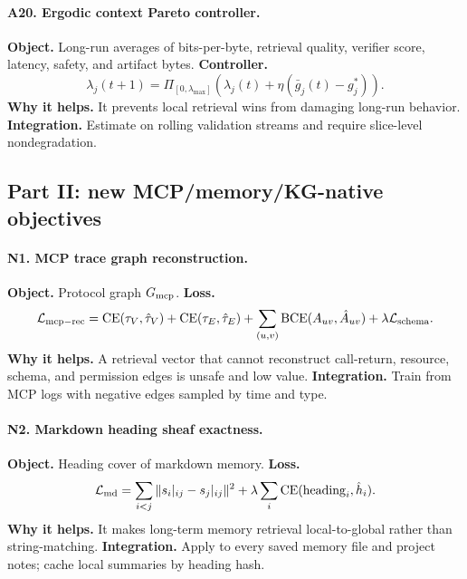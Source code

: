 \documentclass[11pt]{article}
\newcommand{\loss}{\mathcal{L}}
\numberwithin{equation}{section}
\begin{document}
\paragraph{A20. Ergodic context Pareto controller.}
\textbf{Object.} Long-run averages of bits-per-byte, retrieval quality, verifier score, latency, safety, and artifact bytes. \textbf{Controller.}
\begin{equation}
\lambda_j(t+1)=\Pi_{[0,\lambda_{\max}]}
\left(\lambda_j(t)+\eta(\bar g_j(t)-g_j^*)\right).
\end{equation}
\textbf{Why it helps.} It prevents local retrieval wins from damaging long-run behavior. \textbf{Integration.} Estimate on rolling validation streams and require slice-level nondegradation.

\clearpage
\subsection{Part II: new MCP/memory/KG-native objectives}

\paragraph{N1. MCP trace graph reconstruction.}
\textbf{Object.} Protocol graph $G_{\rm mcp}$. \textbf{Loss.}
\begin{equation}
\loss_{\rm mcp-rec}=\operatorname{CE}(\tau_V,\hat\tau_V)+\operatorname{CE}(\tau_E,\hat\tau_E)+\sum_{(u,v)}\operatorname{BCE}(A_{uv},\hat A_{uv})+\lambda\loss_{\rm schema}.
\end{equation}
\textbf{Why it helps.} A retrieval vector that cannot reconstruct call-return, resource, schema, and permission edges is unsafe and low value. \textbf{Integration.} Train from MCP logs with negative edges sampled by time and type.

\paragraph{N2. Markdown heading sheaf exactness.}
\textbf{Object.} Heading cover of markdown memory. \textbf{Loss.}
\begin{equation}
\loss_{\rm md}=\sum_{i<j}\|s_i|_{ij}-s_j|_{ij}\|^2+\lambda\sum_i\operatorname{CE}(\mathrm{heading}_i,\hat h_i).
\end{equation}
\textbf{Why it helps.} It makes long-term memory retrieval local-to-global rather than string-matching. \textbf{Integration.} Apply to every saved memory file and project notes; cache local summaries by heading hash.
\end{document}
